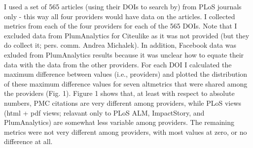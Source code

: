 \documentclass[letterpaper,superscriptaddress,showkeys,longbibliography]{revtex4-1}\usepackage{graphicx, color}
\begin{document}
I used a set of 565 articles (using their DOIs to search by) from PLoS journals only - this way all four providers would have data on the articles. I collected metrics from each of the four providers for each of the 565 DOIs. Note that I excluded data from PlumAnalytics for Citeulike as it was not provided (but they do collect it; pers. comm. Andrea Michalek). In addition, Facebook data was exluded from PlumAnalytics results because it was unclear how to equate their data with the data from the other providers. For each DOI I calculated the maximum difference between values (i.e., providers) and plotted the distribution of these maximum difference values for seven altmetrics that were shared among the providers (Fig. 1). Figure 1 shows that, at least with respect to absolute numbers, PMC citations are very different among providers, while PLoS views (html + pdf views; relavant only to PLoS ALM, ImpactStory, and PlumAnalytics) are somewhat less variable among providers. The remaining metrics were not very different among providers, with most values at zero, or no difference at all. 




\end{document}
